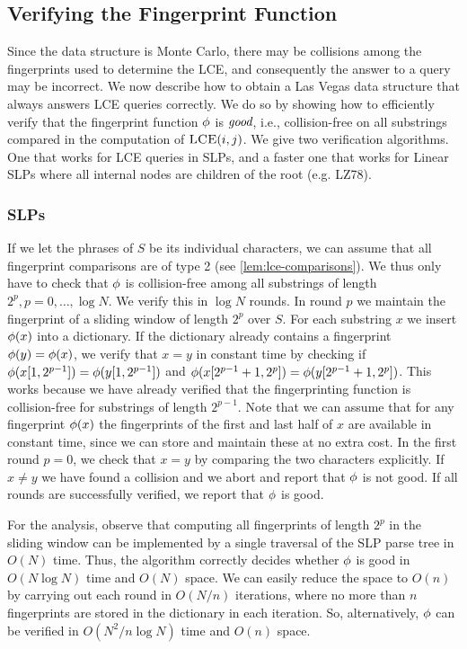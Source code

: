 \documentclass[11pt]{article}
\newcommand{\lceq}{\ensuremath{\textsc{LCE}}}
\newcommand{\fp}{\ensuremath\phi}
\begin{document}
\subsection{Verifying the Fingerprint Function}
Since the data structure is Monte Carlo, there may be collisions among the fingerprints used to determine the LCE, and consequently the answer to a query may be incorrect. We now describe how to obtain a Las Vegas data structure that always answers LCE queries correctly. We do so by showing how to efficiently verify that the fingerprint function $\fp$ is $\emph{good}$, i.e., collision-free on all substrings compared in the computation of $\lceq(i,j)$. We give two verification algorithms. One that works for LCE queries in SLPs, and a faster one that works for Linear SLPs where all internal nodes are children of the root (e.g. LZ78).






\subsubsection{SLPs}
If we let the phrases of $S$ be its individual characters, we can assume that all fingerprint comparisons are of type 2 (see \autoref{lem:lce-comparisons}). We thus only have to check that $\fp$ is collision-free among all substrings of length $2^p,p=0,\ldots,\log N$. We verify this in $\log N$ rounds. In round $p$ we maintain the fingerprint of a sliding window of length $2^p$ over $S$. For each substring $x$ we insert $\fp(x)$ into a dictionary. If the dictionary already contains a fingerprint $\fp(y)=\fp(x)$, we verify that $x=y$ in constant time by checking if $\fp(x[1,2^{p-1}]) = \fp(y[1,2^{p-1}])$ and $\fp(x[2^{p-1}+1,2^p]) = \fp(y[2^{p-1}+1,2^{p}])$. This works because we have already verified that the fingerprinting function is collision-free for substrings of length $2^{p-1}$. Note that we can assume that for any fingerprint $\fp(x)$ the fingerprints of the first and last half of $x$ are available in constant time, since we can store and maintain these at no extra cost. In the first round $p=0$, we check that $x=y$ by comparing the two characters explicitly. If $x \neq y$ we have found a collision and we abort and report that $\fp$ is not good. If all rounds are successfully verified, we report that $\fp$ is good.

For the analysis, observe that computing all fingerprints of length $2^p$ in the sliding window can be implemented by a single traversal of the SLP parse tree in $O(N)$ time. Thus, the algorithm correctly decides whether $\fp$ is good in $O(N\log N)$ time and $O(N)$ space. We can easily reduce the space to $O(n)$ by carrying out each round in $O(N/n)$ iterations, where no more than $n$ fingerprints are stored in the dictionary in each iteration. So, alternatively, $\fp$ can be verified in $O(N^2/n \log N)$ time and $O(n)$ space.
\end{document}

